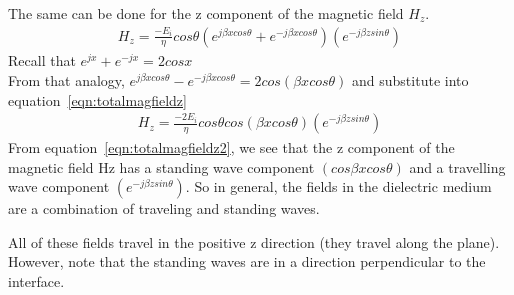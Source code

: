 The same can be done for the z component of the magnetic field $H_z$.
\begin{align}
H_z = \frac{-E_i}{\eta}cos\theta(e^{j\beta xcos\theta} + e^{-j\beta xcos\theta}) (e^{-j\beta zsin\theta})
\label{eqn:totalmagfieldz}
\end{align}  
Recall that $e^{jx} + e^{-jx} = 2cosx$\\
From that analogy, $e^{j\beta xcos \theta} - e^{-j\beta xcos\theta} = 2cos(\beta xcos\theta)$ and substitute into equation~\eqref{eqn:totalmagfieldz}
\begin{align}
H_z = \frac{-2E_i}{\eta}cos\theta cos(\beta xcos\theta) (e^{-j \beta zsin\theta})
\label{eqn:totalmagfieldz2}
\end{align}
From equation~\eqref{eqn:totalmagfieldz2}, we see that the z component of the magnetic field Hz has a standing wave component $(cos\beta xcos\theta)$ and a travelling wave component $(e^{-j\beta zsin\theta})$. So in general, the fields in the dielectric medium are a combination of traveling and standing waves.

All of these fields travel in the positive z direction (they travel along the plane). However, note that the standing waves are in a direction perpendicular to the interface.
 
